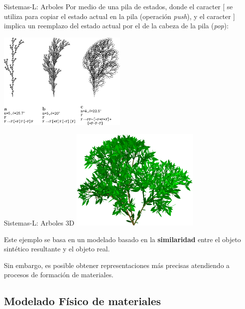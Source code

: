 \documentclass[spanish]{beamer}
\begin{document}
\begin{frame}{Sistemas-L: Arboles}
Por medio de una pila de estados, donde el caracter $[$ se utiliza para copiar el estado actual en la pila (operación {\em push}), y el caracter $]$ implica un reemplazo del estado actual por el de la cabeza de la pila ({\em pop}):


\center
\includegraphics[width=6.3cm]{../figures/sistemalcorchete}

\end{frame}

\begin{frame}{Sistemas-L: Arboles 3D}
\center
\includegraphics[width=6.3cm]{../figures/3dlsystem}

\end{frame}

\begin{frame}
Este ejemplo se basa en un modelado basado en la \textbf{similaridad} entre el objeto sintético resultante y el objeto real.

\vspace{1cm}

Sin embargo, es posible obtener representaciones más precisas atendiendo a procesos de formación de materiales.
\end{frame}

\subsection{Modelado Físico de materiales}
\end{document}
